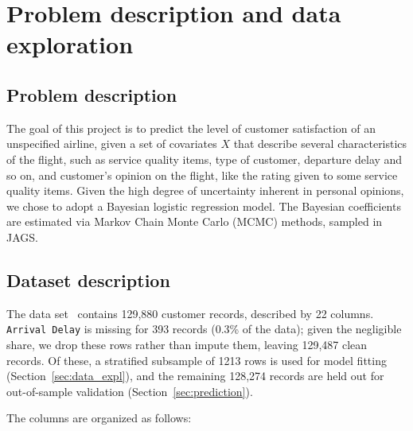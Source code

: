 \section{Problem description and data exploration}
\label{sec:problem}

\subsection{Problem description}
The goal of this project is to predict the level of customer satisfaction of an unspecified airline, given a set of covariates $X$ that describe several characteristics of the flight, such as service quality items, type of customer, departure delay and so on, and customer's opinion on the flight, like the rating given to some service quality items. Given the high degree of uncertainty inherent in personal opinions, we chose to adopt a Bayesian logistic regression model\cite{bl_book}. 
The Bayesian coefficients are estimated via Markov Chain Monte Carlo (MCMC) methods, sampled in JAGS.

\subsection{Dataset description}

The data set~\cite{kaggle_ds} contains 129{,}880 customer records, described by 22
columns. \texttt{Arrival Delay} is missing for 393 records (0.3\% of the data);
given the negligible share, we drop these rows rather than impute them, leaving
129{,}487 clean records. Of these, a stratified subsample of 1213 rows is used for
model fitting (Section~\ref{sec:data_expl}), and the remaining 128{,}274 records are held out for
out-of-sample validation (Section~\ref{sec:prediction}).

The columns are organized as follows:

